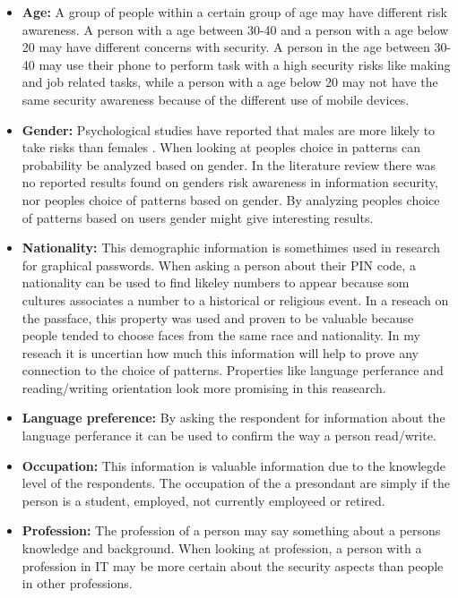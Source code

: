   \begin{itemize}
    \item {\bf Age:} A group of people within a certain group of age may have different risk awareness. A person with a age between 30-40 and a person with a age below 20 may have different concerns with security. A person in the age between 30-40 may use their phone to perform task with a high security risks like making and job related tasks, while a person with a age below 20 may not have the same security awareness because of the different use of mobile devices.
    \item {\bf Gender:} Psychological studies have reported that males are more likely to take risks than females \cite{Byrnes}. When looking at peoples choice in patterns can probability be analyzed based on gender. In the literature review there was no reported results found on genders risk awareness in information security, nor peoples choice of patterns based on gender. By analyzing peoples choice of patterns based on users gender might give interesting results. 
    \item {\bf Nationality:} This demographic information is somethimes used in research for graphical passwords. When asking a person about their PIN code, a nationality can be used to find likeley numbers to appear because som cultures associates a number to a historical or religious event. In a reseach on the passface, this property was used and proven to be valuable because people tended to choose faces from the same race and nationality. In my reseach it is uncertian how much this information will help to prove any connection to the choice of patterns. Properties like language perferance and reading/writing orientation look more promising in this reasearch.
    \item {\bf Language preference:} By asking the respondent for information about the language perferance it can be used to confirm the way a person read/write.
    \item{\bf Occupation:} This information is valuable information due to the knowlegde level of the respondents. The occupation of the a presondant are simply if the person is a student, employed, not currently employeed or retired.
    \item {\bf Profession:} The profession of a person may say something about a persons knowledge and background. When looking at profession, a person with a profession in IT may be more certain about the security aspects than people in other professions. 

\end{itemize}
